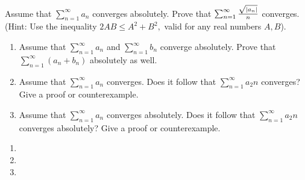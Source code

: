 \documentclass[12pt,letterpaper,boxed]{hmcpset}
\DeclarePairedDelimiter\abs{\lvert}{\rvert}%
\begin{document}
\begin{solution}

\end{solution}


\begin{problem}[Exercise 3.6]
Assume that $\sum_{n = 1}^{\infty} a_n$ converges absolutely. Prove that $\sum_{n =1}^{\infty} \frac{\sqrt{\abs{a_n}}}{n}$ converges. (Hint: Use the inequality $2AB \leq A^{2} + B^{2},$ valid for any real numbers $A, B$).
\end{problem}


\begin{solution}

\end{solution}


\begin{problem}[Exercise 3.7]
\begin{enumerate}
    \item Assume that $\sum_{n = 1}^{\infty} a_n$ and $\sum_{n = 1}^{\infty} b_n$ converge absolutely. Prove that $\sum_{n = 1}^{\infty} (a_n + b_n)$ absolutely as well.
    \item Assume that $\sum_{n = 1}^{\infty} a_n$ converges. Does it follow that $\sum_{n = 1}^{\infty} a_2n$ converges? Give a proof or counterexample.
    \item Assume that $\sum_{n = 1}^{\infty} a_n$ converges absolutely. Does it follow that $\sum_{n = 1}^{\infty} a_2n$ converges absolutely? Give a proof or counterexample.
\end{enumerate}
\end{problem}

\begin{solution}
\begin{enumerate}
    \item 
    \item
    \item 
\end{enumerate}
\end{solution}
\end{document}
